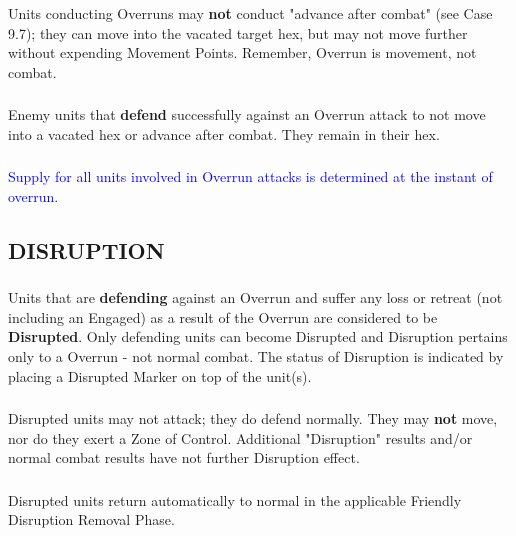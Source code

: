 \subsubsection{} Units conducting Overruns may \textbf{not} conduct "advance after combat" (see Case 9.7); they can move into the vacated target hex, but may not move further without expending Movement Points. Remember, Overrun is movement, not combat.

\subsubsection{} Enemy units that \textbf{defend} successfully against an Overrun attack to not move into a vacated hex or advance after combat. They remain in their hex.
\nobreak
\textcolor{blue}{\subsubsection{} Supply for all units involved in Overrun attacks is determined at the instant of overrun.}

\subsection{DISRUPTION}

\subsubsection{} Units that are \textbf{defending} against an Overrun and suffer any loss or retreat (not including an Engaged) as a result of the Overrun are considered to be \textbf{Disrupted}. Only defending units can become Disrupted and Disruption pertains only to a Overrun - not normal combat. The status of Disruption is indicated by placing a Disrupted Marker on top of the unit(s).

\subsubsection{} Disrupted units may not attack; they do defend normally. They may \textbf{not} move, nor do they exert a Zone of Control. Additional "Disruption" results and/or normal combat results have not further Disruption effect.

\subsubsection{} Disrupted units return automatically to normal in the applicable Friendly Disruption Removal Phase.

